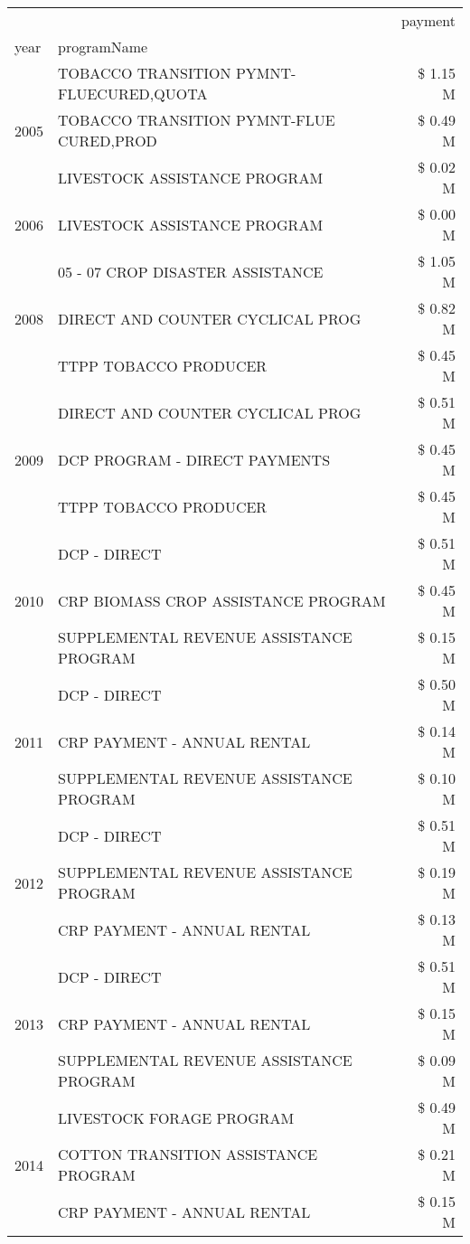 \begin{tabular}{llr}
\toprule
 &  & payment \\
year & programName &  \\
\midrule
\multirow[t]{3}{*}{2005} & TOBACCO TRANSITION PYMNT-FLUECURED,QUOTA & \$ 1.15 M \\
 & TOBACCO TRANSITION PYMNT-FLUE CURED,PROD & \$ 0.49 M \\
 & LIVESTOCK ASSISTANCE PROGRAM & \$ 0.02 M \\
\cline{1-3}
2006 & LIVESTOCK ASSISTANCE PROGRAM & \$ 0.00 M \\
\cline{1-3}
\multirow[t]{3}{*}{2008} & 05 - 07 CROP DISASTER ASSISTANCE & \$ 1.05 M \\
 & DIRECT AND COUNTER CYCLICAL PROG & \$ 0.82 M \\
 & TTPP TOBACCO PRODUCER & \$ 0.45 M \\
\cline{1-3}
\multirow[t]{3}{*}{2009} & DIRECT AND COUNTER CYCLICAL PROG & \$ 0.51 M \\
 & DCP PROGRAM - DIRECT PAYMENTS & \$ 0.45 M \\
 & TTPP TOBACCO PRODUCER & \$ 0.45 M \\
\cline{1-3}
\multirow[t]{3}{*}{2010} & DCP - DIRECT & \$ 0.51 M \\
 & CRP BIOMASS CROP ASSISTANCE PROGRAM & \$ 0.45 M \\
 & SUPPLEMENTAL REVENUE ASSISTANCE PROGRAM & \$ 0.15 M \\
\cline{1-3}
\multirow[t]{3}{*}{2011} & DCP - DIRECT & \$ 0.50 M \\
 & CRP PAYMENT - ANNUAL RENTAL & \$ 0.14 M \\
 & SUPPLEMENTAL REVENUE ASSISTANCE PROGRAM & \$ 0.10 M \\
\cline{1-3}
\multirow[t]{3}{*}{2012} & DCP - DIRECT & \$ 0.51 M \\
 & SUPPLEMENTAL REVENUE ASSISTANCE PROGRAM & \$ 0.19 M \\
 & CRP PAYMENT - ANNUAL RENTAL & \$ 0.13 M \\
\cline{1-3}
\multirow[t]{3}{*}{2013} & DCP - DIRECT & \$ 0.51 M \\
 & CRP PAYMENT - ANNUAL RENTAL & \$ 0.15 M \\
 & SUPPLEMENTAL REVENUE ASSISTANCE PROGRAM & \$ 0.09 M \\
\cline{1-3}
\multirow[t]{3}{*}{2014} & LIVESTOCK FORAGE PROGRAM & \$ 0.49 M \\
 & COTTON TRANSITION ASSISTANCE PROGRAM & \$ 0.21 M \\
 & CRP PAYMENT - ANNUAL RENTAL & \$ 0.15 M \\

\end{tabular}
